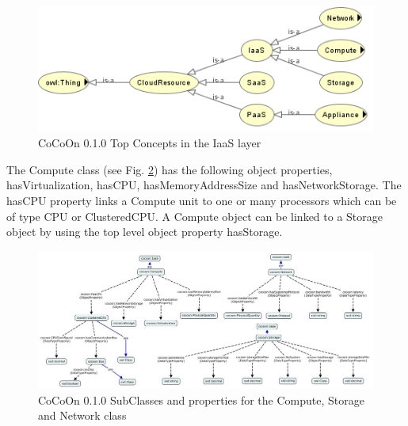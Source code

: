 \begin{figure}
  \includegraphics[width=\textwidth,keepaspectratio]{Figures/0.1/CloudResource.png}
  \caption{CoCoOn 0.1.0 Top Concepts in the IaaS layer}
  \label{fig:CoCoOn0.1CloudResource}
\end{figure}

The Compute class (see Fig. \ref{fig:CoCoOn0.1SubClassesPropertiesComputeStorageNetwork}) has the following object properties, hasVirtualization, hasCPU, hasMemoryAddressSize and hasNetworkStorage. The hasCPU property links a Compute unit to one or many processors which can be of type CPU or ClusteredCPU. A Compute object can be linked to a Storage object by using the top level object property hasStorage.

\begin{figure}
  \includegraphics[width=\textwidth,keepaspectratio]
  {Figures/0.1/SubClassesPropertiesComputeStorageNetwork.jpg}
  \caption{CoCoOn 0.1.0 SubClasses and properties for the Compute, Storage and Network class}
  \label{fig:CoCoOn0.1SubClassesPropertiesComputeStorageNetwork}
\end{figure}

